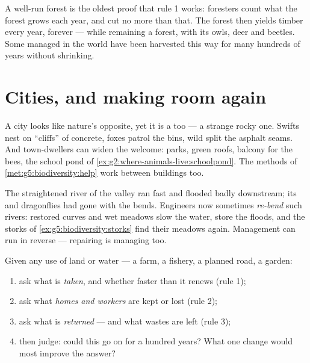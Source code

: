 \begin{example}\label{ex:g5:people-and-nature:forester}
A well-run forest is the oldest proof that rule 1 works:
foresters count what the forest grows each year, and cut no
more than that. The forest then yields timber every year,
forever --- while remaining a forest, with its owls, deer
and beetles. Some managed  in the world have been
harvested this way for many hundreds of years without
shrinking.
\end{example}

\section{Cities, and making room again}

\begin{example}\label{ex:g5:people-and-nature:city}
A city looks like nature's opposite, yet it is a  too
--- a strange rocky one. Swifts nest on ``cliffs'' of
concrete, foxes patrol the bins, wild  split the
asphalt seams. And town-dwellers can widen the welcome:
parks, green roofs, balcony  for the bees, the school
pond of \cref{ex:g2:where-animals-live:schoolpond}. The
methods of \cref{met:g5:biodiversity:help} work between
buildings too.
\end{example}

\begin{example}\label{ex:g5:people-and-nature:river}
The straightened river of the valley ran fast and flooded
badly downstream; its  and dragonflies had gone with the
bends. Engineers now sometimes \emph{re-bend} such rivers:
restored curves and wet meadows slow the water, store the
floods, and the storks of \cref{ex:g5:biodiversity:storks}
find their meadows again. Management can run in reverse ---
repairing is managing too.
\end{example}

\begin{method}\label{met:g5:people-and-nature:judge}
Given any use of land or water --- a farm, a fishery, a
planned road, a garden:
\begin{enumerate}
  \item ask what is \emph{taken}, and whether faster than it
        renews (rule 1);
  \item ask what \emph{homes and workers} are kept or lost
        (rule 2);
  \item ask what is \emph{returned} --- and what wastes are
        left (rule 3);
  \item then judge: could this go on for a hundred years?
        What one change would most improve the answer?
\end{enumerate}
\end{method}


